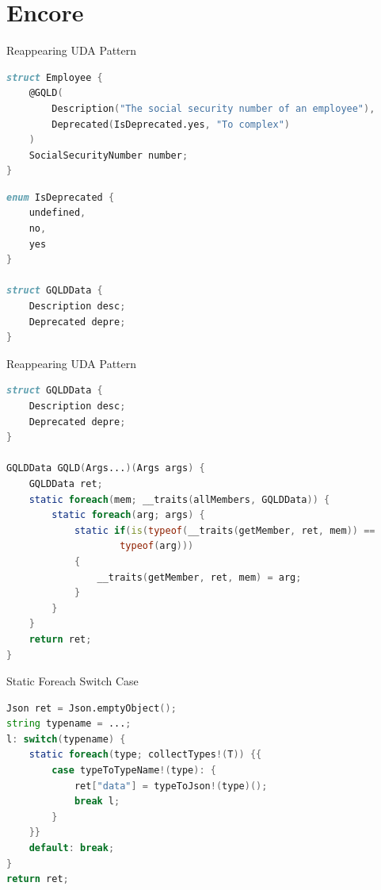 \documentclass[aspectratio=169,notes]{beamer}
\begin{document}
	\section{Encore}
	\begin{frame}[fragile]{Reappearing UDA Pattern}
\begin{lstlisting}[language=D,basicstyle=\scriptsize\ttfamily]
struct Employee {
	@GQLD(
		Description("The social security number of an employee"),
		Deprecated(IsDeprecated.yes, "To complex")
	)
	SocialSecurityNumber number;
}
\end{lstlisting}
\pause
\begin{lstlisting}[language=D,basicstyle=\scriptsize\ttfamily,firstnumber=9]
enum IsDeprecated {
	undefined,
	no,
	yes
}

struct GQLDData {
	Description desc;
	Deprecated depre;
}
\end{lstlisting}
	\end{frame}

	\begin{frame}[fragile]{Reappearing UDA Pattern}
\begin{lstlisting}[language=D,basicstyle=\footnotesize\ttfamily]
struct GQLDData {
	Description desc;
	Deprecated depre;
}

GQLDData GQLD(Args...)(Args args) {
	GQLDData ret;
	static foreach(mem; __traits(allMembers, GQLDData)) {
		static foreach(arg; args) {
			static if(is(typeof(__traits(getMember, ret, mem)) == 
					typeof(arg))) 
			{
				__traits(getMember, ret, mem) = arg;
			}
		}
	}
	return ret;
}
\end{lstlisting}
	\end{frame}

	\begin{frame}[fragile]{Static Foreach Switch Case}
\begin{lstlisting}[language=D,basicstyle=\footnotesize\ttfamily]
Json ret = Json.emptyObject();
string typename = ...;
l: switch(typename) {
	static foreach(type; collectTypes!(T)) {{
		case typeToTypeName!(type): {
			ret["data"] = typeToJson!(type)();
			break l;
		}
	}}
	default: break;
}
return ret;
\end{lstlisting}
	\end{frame}
\end{document}
